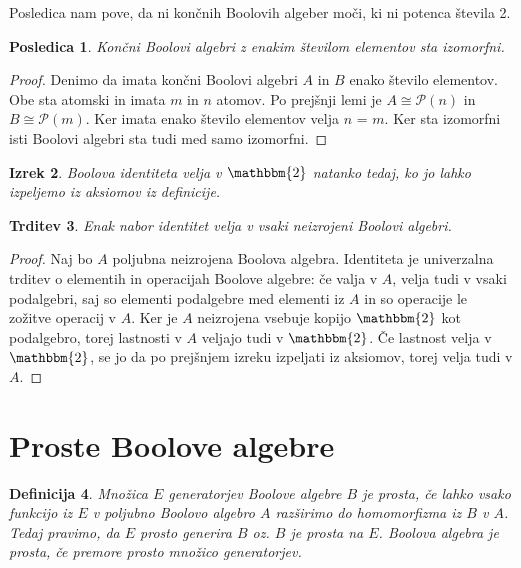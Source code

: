 \documentclass{amsart}
\newtheorem{izrek}{Izrek}[section]
\newtheorem{trditev}[izrek]{Trditev}
\newtheorem{posledica}[izrek]{Posledica}
\newtheorem{definicija}[izrek]{Definicija}
\begin{document}
Posledica nam pove, da ni končnih Boolovih algeber moči, ki ni potenca števila 2.

\begin{posledica}
    Končni Boolovi algebri z enakim številom elementov sta izomorfni.
\end{posledica}

\begin{proof}
    Denimo da imata končni Boolovi algebri $A$ in $B$ enako število elementov.
    Obe sta atomski in imata $m$ in $n$ atomov. Po prejšnji lemi je 
    \(A \cong \mathcal{P}(n)\) in \(B \cong \mathcal{P}(m)\). Ker imata enako
    število elementov velja $n$ = $m$. Ker sta izomorfni isti Boolovi
    algebri sta tudi med samo izomorfni.
\end{proof}

\begin{izrek}
    Boolova identiteta velja v $\mathbbm{2}$ natanko tedaj, 
    ko jo lahko izpeljemo iz aksiomov iz definicije.
\end{izrek}

\begin{trditev}
    Enak nabor identitet velja v vsaki neizrojeni Boolovi algebri.
\end{trditev}

\begin{proof}
    Naj bo $A$ poljubna neizrojena Boolova algebra.
    Identiteta je univerzalna trditev o elementih in operacijah Boolove
    algebre: če valja v $A$, velja tudi v vsaki podalgebri, saj so elementi 
    podalgebre med elementi iz $A$ in so operacije le zožitve operacij v $A$.
    Ker je $A$ neizrojena vsebuje kopijo $\mathbbm{2}$ kot podalgebro, 
    torej lastnosti v $A$ veljajo tudi v $\mathbbm{2}$. Če lastnost velja
    v  $\mathbbm{2}$, se jo da po prejšnjem izreku izpeljati iz aksiomov,
    torej velja tudi v $A$.
\end{proof}

\section{Proste Boolove algebre}

\begin{definicija}
    Množica $E$ generatorjev Boolove algebre $B$ je prosta, če lahko vsako funkcijo iz $E$ v poljubno
    Boolovo algebro $A$ razširimo do homomorfizma iz $B$ v $A$. Tedaj pravimo, da $E$ prosto generira $B$ oz.
    $B$ je prosta na $E$. Boolova algebra je prosta, če premore prosto množico generatorjev.
\end{definicija}
\end{document}
